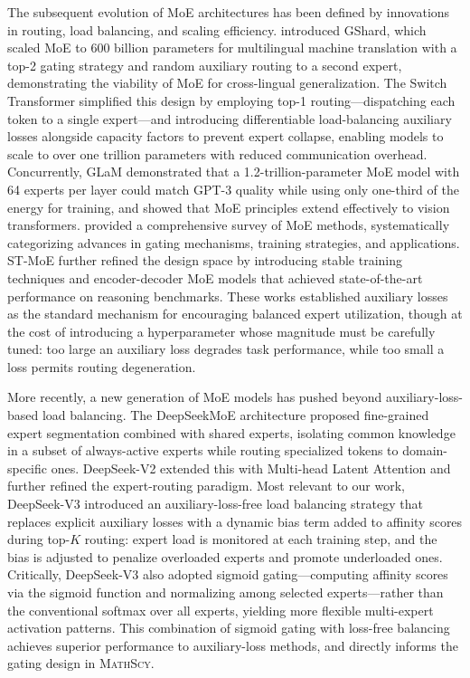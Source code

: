\documentclass[11pt,a4paper]{article}
\newcommand{\mathscy}{\textsc{MathScy}}
\begin{document}
The subsequent evolution of MoE architectures has been defined by innovations in routing, load balancing, and scaling efficiency. \cite{lepikhin2021gshard} introduced GShard, which scaled MoE to 600 billion parameters for multilingual machine translation with a top-2 gating strategy and random auxiliary routing to a second expert, demonstrating the viability of MoE for cross-lingual generalization. The Switch Transformer \citep{fedus2022switch} simplified this design by employing top-1 routing---dispatching each token to a single expert---and introducing differentiable load-balancing auxiliary losses alongside capacity factors to prevent expert collapse, enabling models to scale to over one trillion parameters with reduced communication overhead. Concurrently, GLaM \citep{du2022glam} demonstrated that a 1.2-trillion-parameter MoE model with 64 experts per layer could match GPT-3 quality while using only one-third of the energy for training, and \citet{riquelme2021scaling} showed that MoE principles extend effectively to vision transformers. \citet{zhou2022mixture} provided a comprehensive survey of MoE methods, systematically categorizing advances in gating mechanisms, training strategies, and applications. ST-MoE \citep{zoph2022st} further refined the design space by introducing stable training techniques and encoder-decoder MoE models that achieved state-of-the-art performance on reasoning benchmarks. These works established auxiliary losses as the standard mechanism for encouraging balanced expert utilization, though at the cost of introducing a hyperparameter whose magnitude must be carefully tuned: too large an auxiliary loss degrades task performance, while too small a loss permits routing degeneration.

More recently, a new generation of MoE models has pushed beyond auxiliary-loss-based load balancing. The DeepSeekMoE architecture \citep{dai2024deepseekmoe} proposed fine-grained expert segmentation combined with shared experts, isolating common knowledge in a subset of always-active experts while routing specialized tokens to domain-specific ones. DeepSeek-V2 \citep{liu2024deepseekv2} extended this with Multi-head Latent Attention and further refined the expert-routing paradigm. Most relevant to our work, DeepSeek-V3 \citep{deepseekai2024deepseekv3} introduced an auxiliary-loss-free load balancing strategy that replaces explicit auxiliary losses with a dynamic bias term added to affinity scores during top-$K$ routing: expert load is monitored at each training step, and the bias is adjusted to penalize overloaded experts and promote underloaded ones. Critically, DeepSeek-V3 also adopted sigmoid gating---computing affinity scores via the sigmoid function and normalizing among selected experts---rather than the conventional softmax over all experts, yielding more flexible multi-expert activation patterns. This combination of sigmoid gating with loss-free balancing achieves superior performance to auxiliary-loss methods, and directly informs the gating design in \mathscy{}.
\end{document}

